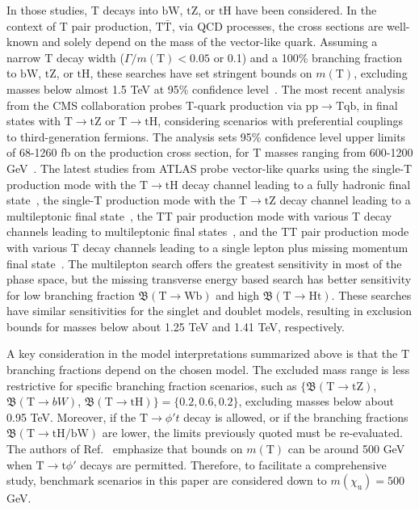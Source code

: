 In those studies, \textrm{T} decays into $\mathrm{bW}$, $\mathrm{tZ}$, or $\mathrm{tH}$ have been considered. In the context of \textrm{T} pair production, $\mathrm{T}\bar{\mathrm{T}}$, via QCD processes, the cross sections are well-known and solely depend on the mass of the vector-like quark.  Assuming a narrow $\mathrm{T}$ decay width ($\Gamma / m(\mathrm{T}) < 0.05$ or 0.1) and a 100\% branching fraction to $\textrm{bW}$, $\textrm{tZ}$, or $\textrm{tH}$, these searches have set stringent bounds on $m(\mathrm{T})$, excluding masses below almost 1.5 \textrm{TeV} at 95\% confidence level~\parencite{CMS:2024bni,CMS:2024qdd,ATLAS:2022ozf,ATLAS:2023bfh,ATLAS:2022hnn,ATLAS:2022tla,ATLAS:2023pja,ATLAS:2024fdw}. The most recent analysis from the CMS collaboration probes T-quark production via $\mathrm{pp} \to \mathrm{T}\textrm{qb}$, in final states with $\mathrm{T} \to \textrm{tZ}$ or $\mathrm{T} \to \textrm{tH}$, considering scenarios with preferential couplings to third-generation fermions. The analysis sets 95\% confidence level upper limits of 68-1260 \textrm{fb} on the production cross section, for T masses ranging from 600-1200 \textrm{GeV}~\parencite{CMS:2024qdd}. The latest studies from ATLAS probe vector-like quarks using the single-T production mode with the $\mathrm{T} \to \textrm{tH}$ decay channel leading to a fully hadronic final state~\parencite{ATLAS:2022ozf}, the single-T production mode with the $\mathrm{T} \to \textrm{tZ}$ decay channel leading to a multileptonic final state~\parencite{ATLAS:2023bfh}, the TT pair production mode with various T decay channels leading to multileptonic final states~\parencite{ATLAS:2022hnn}, and the TT pair production mode with various T decay channels leading to a single lepton plus missing momentum final state~\parencite{ATLAS:2022tla,ATLAS:2023pja}. 
The multilepton search offers the greatest sensitivity in most of the phase space, but the missing transverse energy based search has better sensitivity for low branching fraction $\mathfrak{B}(\mathrm{T}\to \textrm{Wb})$ and high $\mathfrak{B}(\mathrm{T}\to \textrm{Ht})$. These searches have similar sensitivities for the singlet and doublet models, resulting in exclusion bounds for masses below about 1.25 \textrm{TeV} and 1.41 \textrm{TeV}, respectively. 


A key consideration in the model interpretations summarized above is that the $\mathrm{T}$ branching fractions depend on the chosen model. The excluded mass range is less restrictive for specific branching fraction scenarios, such as $\{\mathfrak{B}(\mathrm{T} \to \textrm{tZ})$, $\mathfrak{B}(\mathrm{T} \to bW)$, $\mathfrak{B}(\mathrm{T} \to \textrm{tH})\}= \{0.2, 0.6, 0.2\}$, excluding masses below about 0.95 \textrm{TeV}. Moreover, if the $\mathrm{T} \to \phi't $ decay is allowed, or if the branching fractions $\mathfrak{B}(\mathrm{T} \to \textrm{tH/bW})$ are lower, the limits previously quoted must be re-evaluated. The authors of Ref.~\parencite{Cacciapaglia:2019zmj} emphasize that bounds on $m(\mathrm{T})$ can be around 500 \textrm{GeV} when $\mathrm{T} \to \mathrm{t}\phi'$ decays are permitted. Therefore, to facilitate a comprehensive study, benchmark scenarios in this paper are considered down to $m(\chi_\mathrm{u}) = 500$ \textrm{GeV}.

